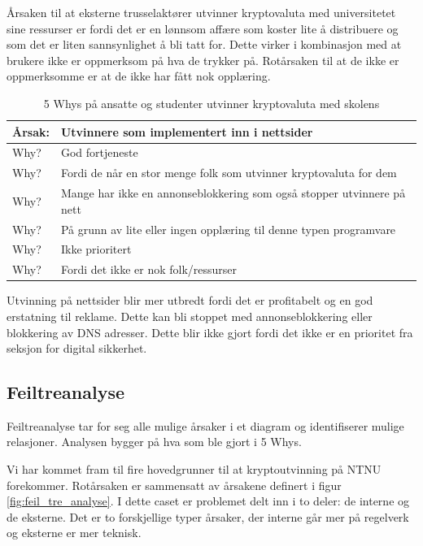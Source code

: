 Årsaken til at eksterne trusselaktører utvinner kryptovaluta med universitetet sine ressurser er fordi det er en lønnsom affære som koster lite å distribuere og som det er liten sannsynlighet å bli tatt for. Dette virker i kombinasjon med at brukere ikke er oppmerksom på hva de trykker på. Rotårsaken til at de ikke er oppmerksomme er at de ikke har fått nok opplæring.

\begin{table} [H]
    \centering
    \begin{tabular}{ | m{5em} | m{30em} | }
        \hline
            \cellcolor{yellow} Årsak: & \cellcolor{yellow} Utvinnere som implementert inn i nettsider              \\
        \hline
            Why? & God fortjeneste                                   \\
        \hline
            Why? & Fordi de når en stor menge folk som utvinner kryptovaluta for dem                                           \\
        \hline
            Why? & Mange har ikke en annonseblokkering som også stopper utvinnere på nett               \\
        \hline
            Why? & På grunn av lite eller ingen opplæring til denne typen programvare           \\
        \hline
            Why? & Ikke prioritert    \\
        \hline
            Why? & Fordi det ikke er nok folk/ressurser    \\
        \hline
    \end{tabular}
    \caption[5 Whys: Minere som er implementert inn i nettsider]{5 Whys på ansatte og studenter utvinner kryptovaluta med skolens}
    \label{5Whys-minere}
\end{table}

Utvinning på nettsider blir mer utbredt fordi det er profitabelt og en god erstatning til reklame. Dette kan bli stoppet med annonseblokkering eller blokkering av DNS adresser. Dette blir ikke gjort fordi det ikke er en prioritet fra seksjon for digital sikkerhet.

\subsection{Feiltreanalyse}
Feiltreanalyse tar for seg alle mulige årsaker i et diagram og identifiserer mulige relasjoner. Analysen bygger på hva som ble gjort i 5 Whys.

Vi har kommet fram til fire hovedgrunner til at kryptoutvinning på NTNU forekommer. Rotårsaken er sammensatt av årsakene definert i figur \ref{fig:feil_tre_analyse}. I dette caset er problemet delt inn i to deler: de interne og de eksterne. Det er to forskjellige typer årsaker, der interne går mer på regelverk og eksterne er mer teknisk. 


